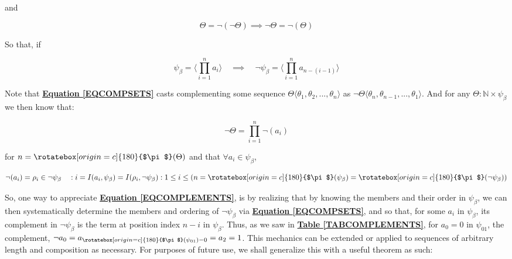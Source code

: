 \documentclass[a4paper, 18pt]{book} %
\newcommand{\invpi}{\rotatebox[origin=c]{180}{$\pi$}}
\begin{document}
\vspace{1em}

and 

\vspace{1em}

\begin{equation}
\Theta = \lnot(\lnot\Theta) \implies \lnot\Theta = \lnot(\Theta)
\end{equation}

\vspace{1em}

So that, if

\vspace{1em}

\begin{equation}
\label{EQCOMPSETS}
\psi_\beta = \langle \prod\limits_{i=1}^{n} a_i \rangle \quad \implies \quad \lnot\psi_\beta = \langle \prod\limits_{i=1}^{n} a_{n-(i-1)} \rangle
\end{equation}

\vspace{1em}


Note that \textbf{\hyperref[EQCOMPSETS]{Equation \ref{EQCOMPSETS}}} casts complementing some sequence $\Theta\langle\theta_1,\theta_2,...,\theta_n \rangle$ as $\lnot\Theta\langle\theta_n,\theta_{n-1},...,\theta_1 \rangle$.  And for any $\Theta: \mathbb{N} \times \psi_\beta$ we then know that:

\vspace{1em}

\begin{equation}
\lnot\Theta = \prod\limits_{i=1}^{n} \lnot(a_i)
\end{equation}

\vspace{1em}

for $n = \invpi(\Theta)$ and that $\forall a_i \in \psi_\beta$, 

\vspace{1em}

\begin{equation}
\label{EQCOMPLEMENTS}
\lnot(a_i) = \rho_i \in \lnot\psi_\beta \quad : i = I(a_i,\psi_\beta) = I(\rho_i,\lnot\psi_\beta): 1 \leq i \leq (n = \invpi(\psi_\beta) = \invpi(\lnot\psi_\beta))
\end{equation}

\vspace{1em}

So, one way to appreciate \textbf{\hyperref[EQCOMPLEMENTS]{Equation \ref{EQCOMPLEMENTS}}}, is by realizing that by knowing the members and their order in $\psi_\beta$, we can then systematically determine the members and ordering of $\lnot\psi_\beta$ via \textbf{\hyperref[EQCOMPSETS]{Equation \ref{EQCOMPSETS}}}, and so that, for some $a_i$ in $\psi_\beta$, its complement in $\lnot\psi_\beta$ is the term at position index $n-i$ in $\psi_\beta$. Thus, as we saw in \textbf{\hyperref[TABCOMPLEMENTS]{Table \ref{TABCOMPLEMENTS}}}, for $a_0 = 0$ in $\psi_{01}$, the complement, $\lnot a_0 = a_{\invpi(\psi_{01})-0} = a_2 = 1$. This mechanics can be extended or applied to sequences of arbitrary length and composition as necessary. For purposes of future use, we shall generalize this with a useful theorem as such:
\end{document}

